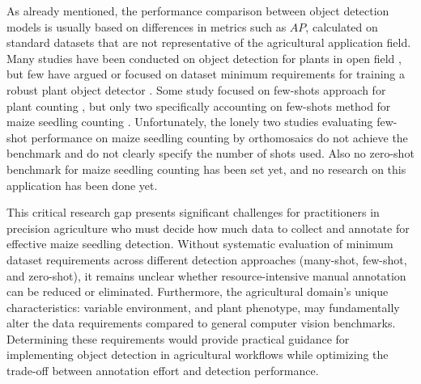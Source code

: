 \documentclass[journal,article,submit,pdftex,moreauthors]{Definitions/mdpi}
\begin{document}
As already mentioned, the performance comparison between object detection models is
usually based on differences in metrics such as $AP$, calculated on standard datasets
that are not representative of the agricultural application field.
Many studies have been conducted on object detection for plants in open field
\cite{barretoAutomaticUAVbasedCounting2021,gengResearchSegmentationMethod2024,jiangDeepSeedlingDeepConvolutional2019,katariIntegratingAutomatedLabeling2024,kitanoCornPlantCounting2019,liDCYOLOImprovedField2024,liSeedlingMaizeCounting2022,liuIntegrateNetDeepLearning2022,liuEstimatingMaizeSeedling2022,luTasselNetCountingMaize2017,macheferMaskRCNNRefitting2020,velumaniEstimatesMaizePlant2021,wangPlotLevelMaizeEarly2023,zhaoStudyLightweightModel2023},
but few have argued or focused on dataset minimum requirements for training a robust plant object detector
\cite{davidPlantDetectionCounting2021,andvaagCountingCanolaGeneralizable2024}.
Some study focused on few-shots approach for plant counting \cite{wangPlotLevelMaizeEarly2023,amirkolaeeAdaTreeFormerFewShot2024},
but only two specifically accounting on few-shots method for maize seedling counting \cite{karamiAutomaticPlantCounting2020,wangAdvancingImageRecognition2024}.
Unfortunately, the lonely two studies evaluating few-shot performance on maize seedling counting 
by orthomosaics do not achieve the benchmark and do not clearly
specify the number of shots used. Also no zero-shot benchmark for maize seedling counting 
has been set yet, and no research on this application has been done yet.

This critical research gap presents significant challenges for practitioners in precision agriculture 
who must decide how much data to collect and annotate for effective maize seedling detection. Without 
systematic evaluation of minimum dataset requirements across different detection approaches (many-shot, 
few-shot, and zero-shot), it remains unclear whether resource-intensive manual annotation can be 
reduced or eliminated. Furthermore, the agricultural domain's unique characteristics: variable environment, 
and plant phenotype, may fundamentally alter the data requirements 
compared to general computer vision benchmarks. Determining these requirements would provide practical 
guidance for implementing object detection in agricultural workflows while optimizing the trade-off between 
annotation effort and detection performance.
\end{document}
